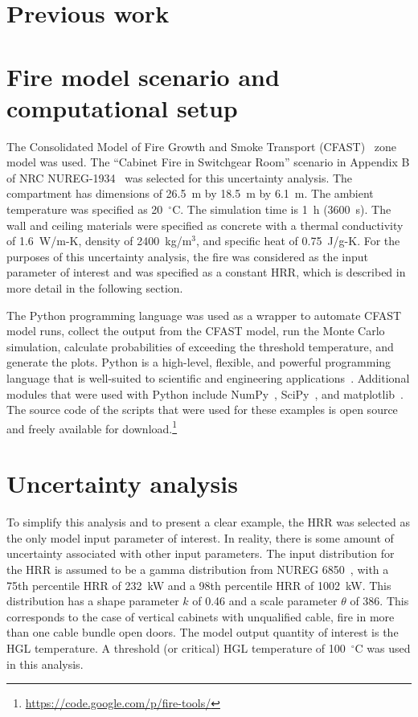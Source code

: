 \documentclass[12pt]{article}
\begin{document}
\section{Previous work}
\label{sec:previous_work}




\section{Fire model scenario and computational setup}
\label{sec:fire_model_scenario_setup}

The Consolidated Model of Fire Growth and Smoke Transport (CFAST)~\cite{CFAST_Users_Guide_6} zone model was used. The ``Cabinet Fire in Switchgear Room'' scenario in Appendix B of NRC NUREG-1934~\cite{NUREG_1934} was selected for this uncertainty analysis. The compartment has dimensions of 26.5~m by 18.5~m by 6.1~m. The ambient temperature was specified as 20~$^\circ$C. The simulation time is 1~h (3600~s). The wall and ceiling materials were specified as concrete with a thermal conductivity of 1.6~W/m-K, density of 2400~kg/m$^3$, and specific heat of 0.75~J/g-K. For the purposes of this uncertainty analysis, the fire was considered as the input parameter of interest and was specified as a constant HRR, which is described in more detail in the following section.

The Python programming language was used as a wrapper to automate CFAST model runs, collect the output from the CFAST model, run the Monte Carlo simulation, calculate probabilities of exceeding the threshold temperature, and generate the plots. Python is a high-level, flexible, and powerful programming language that is well-suited to scientific and engineering applications~\cite{Oliphant:2007}. Additional modules that were used with Python include NumPy~\cite{oliphant2006guide}, SciPy~\cite{Jones:2001fk}, and matplotlib~\cite{Hunter:2007}. The source code of the scripts that were used for these examples is open source and freely available for download.\footnote{\url{https://code.google.com/p/fire-tools/}}


\section{Uncertainty analysis}
\label{sec:uncertainty_analysis}

 To simplify this analysis and to present a clear example, the HRR was selected as the only model input parameter of interest. In reality, there is some amount of uncertainty associated with other input parameters. The input distribution for the HRR is assumed to be a gamma distribution from NUREG 6850~\cite{NUREG_6850}, with a 75th percentile HRR of 232~kW and a 98th percentile HRR of 1002~kW. This distribution has a shape parameter $k$ of 0.46 and a scale parameter $\theta$ of 386. This corresponds to the case of vertical cabinets with unqualified cable, fire in more than one cable bundle open doors. The model output quantity of interest is the HGL temperature. A threshold (or critical) HGL temperature of 100~$^\circ$C was used in this analysis.
\end{document}
